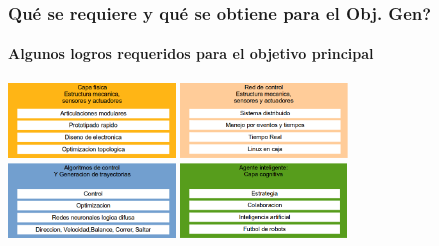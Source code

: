 \mode*
\begin{frame}[label=def_objesp]
  \frametitle{Qu\'e se requiere y qu\'e se obtiene para el Obj. Gen?}
  \framesubtitle{Algunos logros requeridos para el objetivo principal}
  \begin{center}
    \hyperlink{exp_capas<2>}{\includegraphics[height=2.0cm]{../images/objCapaFisica.png}}
    \hyperlink{exp_capas<3>}{\includegraphics[height=2.0cm]{../images/objCapaRAS.png}}\\
    \hyperlink{exp_capas<4>}{\includegraphics[height=2.0cm]{../images/objCapaControl.png}}
    \hyperlink{exp_capas<5>}{\includegraphics[height=2.0cm]{../images/objCapaCognitiva.png}}
  \end{center}
  \hyperlink{exp_capas}{}
\end{frame}
